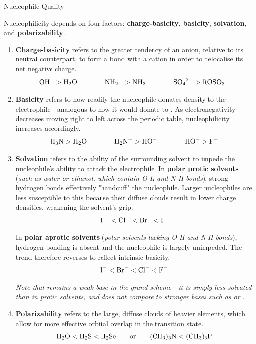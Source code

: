 \documentclass[10pt]{article}
\begin{document}
    \begin{core}[label=core:nuc_quality]{Nucleophile Quality}

      Nucleophilicity depends on four factors: \textbf{charge-basicity}, \textbf{basicity}, \textbf{solvation}, and \textbf{polarizability}.

      \begin{enumerate}

        \item \textbf{Charge-basicity} refers to the greater tendency of an anion, relative to its neutral counterpart, to form a bond with a cation in order to delocalise its net negative charge.
        \[
          \ce{OH-} > \ce{H2O}\qquad\qquad\ce{NH2-} > \ce{NH3}\qquad\qquad\ce{SO4^{2-}} > \ce{ROSO3-}
        \]

        \item \textbf{Basicity} refers to how readily the nucleophile donates  density to the electrophile---analogous to how it would donate to . As electronegativity decreases moving right to left across the periodic table, nucleophilicity increases accordingly.
        \[
          \ce{H3N} > \ce{H2O}\qquad\qquad\ce{H2N-} > \ce{HO-}\qquad\qquad\ce{HO-} > \ce{F-}
        \]

        \item \textbf{Solvation} refers to the ability of the surrounding solvent to impede the nucleophile's ability to attack the electrophile. In \textbf{polar protic solvents} (\textit{such as water or ethanol, which contain O-H and N-H bonds}), strong hydrogen bonds effectively "handcuff" the nucleophile. Larger nucleophiles are less susceptible to this because their diffuse  clouds result in lower charge densities, weakening the solvent's grip.
        \[
          \ce{F-} < \ce{Cl-} < \ce{Br-} < \ce{I-}
        \]

        In \textbf{polar aprotic solvents} (\textit{polar solvents lacking O-H and N-H bonds}), hydrogen bonding is absent and the nucleophile is largely unimpeded. The trend therefore reverses to reflect intrinsic basicity.
        \[
          \ce{I-} < \ce{Br-} < \ce{Cl-} < \ce{F-}
        \]

        \textit{Note that  remains a weak base in the grand scheme---it is simply less solvated than  in protic solvents, and does not compare to stronger bases such as  or .}

        \item \textbf{Polarizability} refers to the large, diffuse  clouds of heavier elements, which allow for more effective orbital overlap in the \snt transition state.
        \[
          \ce{H2O} < \ce{H2S} < \ce{H2Se} \qquad\text{or}\qquad \ce{(CH3)3N} < \ce{(CH3)3P}
        \]
      

\end{enumerate}
\end{core}
\end{document}
